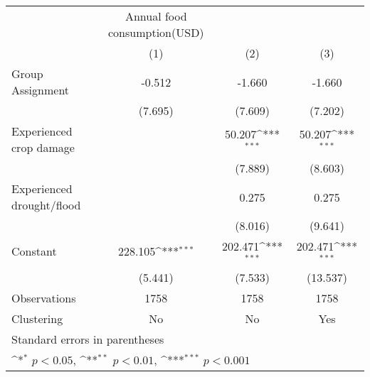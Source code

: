 {
\def\sym#1{\ifmmode^{#1}\else\(^{#1}\)\fi}
\begin{tabular}{l*{3}{c}}
\hline\hline
                    &Annual food consumption(USD)                                     \\
                    &\multicolumn{1}{c}{(1)}         &\multicolumn{1}{c}{(2)}         &\multicolumn{1}{c}{(3)}         \\
\hline
Group Assignment    &      -0.512         &      -1.660         &      -1.660         \\
                    &     (7.695)         &     (7.609)         &     (7.202)         \\
[1em]
Experienced crop damage&                     &      50.207\sym{***}&      50.207\sym{***}\\
                    &                     &     (7.889)         &     (8.603)         \\
[1em]
Experienced drought/flood&                     &       0.275         &       0.275         \\
                    &                     &     (8.016)         &     (9.641)         \\
[1em]
Constant            &     228.105\sym{***}&     202.471\sym{***}&     202.471\sym{***}\\
                    &     (5.441)         &     (7.533)         &    (13.537)         \\
\hline
Observations        &        1758         &        1758         &        1758         \\
Clustering          &          No         &          No         &         Yes         \\
\hline\hline
\multicolumn{4}{l}{\footnotesize Standard errors in parentheses}\\
\multicolumn{4}{l}{\footnotesize \sym{*} \(p<0.05\), \sym{**} \(p<0.01\), \sym{***} \(p<0.001\)}\\
\end{tabular}
}

